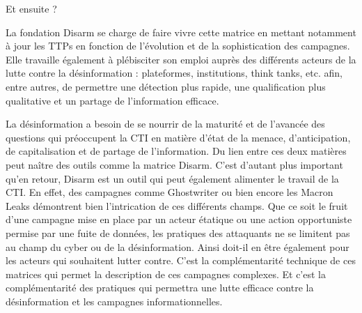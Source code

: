 Et ensuite ?

La fondation Disarm se charge de faire vivre cette matrice en mettant notamment à jour les TTPs en fonction de l’évolution et de la sophistication des campagnes. Elle travaille également à plébisciter son emploi auprès des différents acteurs de la lutte contre la désinformation : plateformes, institutions, think tanks, etc. afin, entre autres, de permettre une détection plus rapide, une qualification plus qualitative et un partage de l’information efficace.

La désinformation a besoin de se nourrir de la maturité et de l’avancée des questions qui préoccupent la CTI en matière d’état de la menace, d’anticipation, de capitalisation et de partage de l'information. Du lien entre ces deux matières peut naître des outils comme la matrice Disarm. C’est d’autant plus important qu’en retour, Disarm est un outil qui peut également alimenter le travail de la CTI. En effet, des campagnes comme Ghostwriter ou bien encore les Macron Leaks démontrent bien l’intrication de ces différents champs. Que ce soit le fruit d’une campagne mise en place par un acteur étatique ou une action opportuniste permise par une fuite de données, les pratiques des attaquants ne se limitent pas au champ du cyber ou de la désinformation. Ainsi doit-il en être également pour les acteurs qui souhaitent lutter contre. C’est la complémentarité technique de ces matrices qui permet la description de ces campagnes complexes. Et c’est la complémentarité des pratiques qui permettra une lutte efficace contre la désinformation et les campagnes informationnelles.



